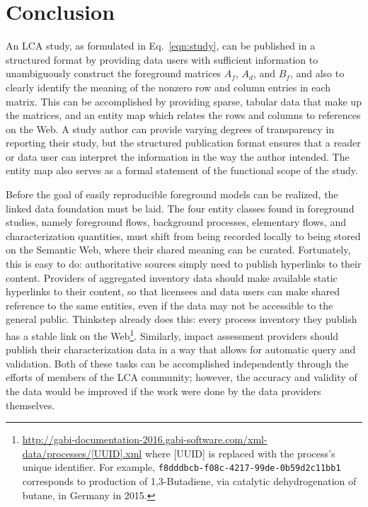 \section{Conclusion}

An LCA study, as formulated in Eq.~\ref{eqn:study}, can be published in a structured format by providing data users with sufficient information to unambiguously construct the foreground matrices $A_f$, $A_d$, and $B_f$, and also to clearly identify the meaning of the nonzero row and column entries in each matrix.  This can be accomplished by providing sparse, tabular data that make up the matrices, and an entity map which relates the rows and columns to references on the Web.  A study author can provide varying degrees of transparency in reporting their study, but the structured publication format ensures that a reader or data user can interpret the information in the way the author intended.  The entity map also serves as a formal statement of the functional scope of the study.

Before the goal of easily reproducible foreground models can be realized, the linked data foundation must be laid.   The four entity classes found in foreground studies, namely foreground flows, background processes, elementary flows, and characterization quantities, must shift from being recorded locally to being stored on the Semantic Web, where their shared meaning can be curated.  Fortunately, this is easy to do: authoritative sources simply need to publish hyperlinks to their content. Providers of aggregated inventory data should make available static hyperlinks to their content, so that licensees and data users can make shared reference to the same entities, even if the data may not be accessible to the general public. Thinkstep already does this: every process inventory they publish has a stable link on the Web\footnote{\href{http://gabi-documentation-2016.gabi-software.com/xml-data/processes/f8dddbcb-f08c-4217-99de-0b59d2c11bb1.xml}{http://gabi-documentation-2016.gabi-software.com/xml-data/processes/[UUID].xml} where [UUID] is replaced with the process's unique identifier. For example, \texttt{f8dddbcb-f08c-4217-99de-0b59d2c11bb1} corresponds to production of 1,3-Butadiene, via catalytic dehydrogenation of butane, in Germany in 2015.}.  Similarly, impact assessment providers should publish their characterization data in a way that allows for automatic query and validation.  Both of these tasks can be accomplished independently through the efforts of members of the LCA community; however, the accuracy and validity of the data would be improved if the work were done by the data providers themselves.

